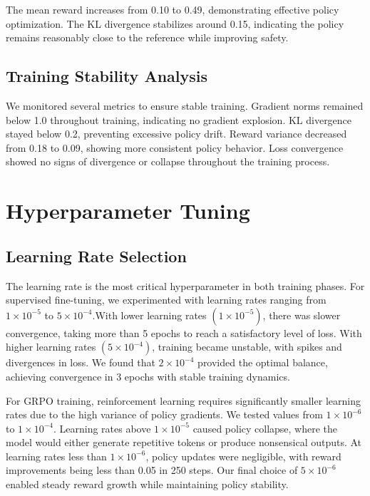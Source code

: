 \documentclass[conference]{IEEEtran}
\begin{document}
The mean reward increases from 0.10 to 0.49, demonstrating effective policy optimization. The KL divergence stabilizes around 0.15, indicating the policy remains reasonably close to the reference while improving safety.

\subsection{Training Stability Analysis}

We monitored several metrics to ensure stable training. Gradient norms remained below 1.0 throughout training, indicating no gradient explosion. KL divergence stayed below 0.2, preventing excessive policy drift. Reward variance decreased from 0.18 to 0.09, showing more consistent policy behavior. Loss convergence showed no signs of divergence or collapse throughout the training process.



\section{Hyperparameter Tuning}

\subsection{Learning Rate Selection}

The learning rate is the most critical hyperparameter in both training phases. For supervised fine-tuning, we experimented with learning rates ranging from $1 \times 10^{-5}$ to $5 \times 10^{-4}$.With lower learning rates $(1 \times 10^{-5})$, there was slower convergence, taking more than 5 epochs to reach a satisfactory level of loss. With higher learning rates $(5 \times 10^{-4})$, training became unstable, with spikes and divergences in loss. We found that $2 \times 10^{-4}$ provided the optimal balance, achieving convergence in 3 epochs with stable training dynamics.

For GRPO training, reinforcement learning requires significantly smaller learning rates due to the high variance of policy gradients. We tested values from $1 \times 10^{-6}$ to $1 \times 10^{-4}$. Learning rates above $1 \times 10^{-5}$ caused policy collapse, where the model would either generate repetitive tokens or produce nonsensical outputs. At learning rates less than $1 \times 10^{-6}$, policy updates were negligible, with reward improvements being less than 0.05 in 250 steps. Our final choice of $5 \times 10^{-6}$ enabled steady reward growth while maintaining policy stability.
\end{document}
